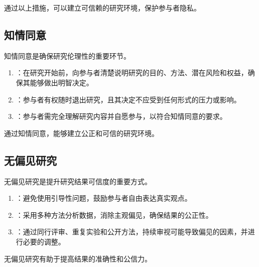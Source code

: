\documentclass[letterpaper,10pt,english]{sphinxmanual}
\begin{document}
\sphinxAtStartPar
通过以上措施，可以建立可信赖的研究环境，保护参与者隐私。


\subsection{知情同意}
\label{\detokenize{user-research/focus-group:id41}}
\sphinxAtStartPar
知情同意是确保研究伦理性的重要环节。
\begin{enumerate}
%
\item {} 
\sphinxAtStartPar
{}：在研究开始前，向参与者清楚说明研究的目的、方法、潜在风险和权益，确保其能够做出明智决定。

\item {} 
\sphinxAtStartPar
{}：参与者有权随时退出研究，且其决定不应受到任何形式的压力或影响。

\item {} 
\sphinxAtStartPar
{}：参与者需完全理解研究内容并自愿参与，以符合知情同意的要求。

\end{enumerate}

\sphinxAtStartPar
通过知情同意，能够建立公正和可信的研究环境。


\subsection{无偏见研究}
\label{\detokenize{user-research/focus-group:id42}}
\sphinxAtStartPar
无偏见研究是提升研究结果可信度的重要方式。
\begin{enumerate}
%
\item {} 
\sphinxAtStartPar
{}：避免使用引导性问题，鼓励参与者自由表达真实观点。

\item {} 
\sphinxAtStartPar
{}：采用多种方法分析数据，消除主观偏见，确保结果的公正性。

\item {} 
\sphinxAtStartPar
{}：通过同行评审、重复实验和公开方法，持续审视可能导致偏见的因素，并进行必要的调整。

\end{enumerate}

\sphinxAtStartPar
无偏见研究有助于提高结果的准确性和公信力。
\end{document}
